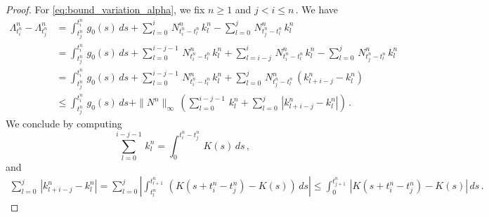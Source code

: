 \documentclass[10pt,a4paper]{amsart}
\begin{document}
\begin{proof}
    For \eqref{eq:bound_variation_alpha}, we fix $n \geq 1$ and $j < i \leq n\,$. We have 
    \begin{align*}
        \Lambda^n_{t^n_i} - \Lambda^n_{t^n_j} &= \int_{t^n_j}^{t^n_i}\,g_0(s)\,ds + \sum_{l = 0}^i\,N^n_{t^n_i - t^n_l}\,k^n_l - \sum_{l = 0}^j\,N^n_{t^n_j - t^n_l}\,k^n_l \\
        &= \int_{t^n_j}^{t^n_i}\,g_0(s)\,ds + \sum_{l = 0}^{i -j -1}\,N^n_{t^n_i - t^n_l}\,k^n_l + \sum_{l = i-j}^i\,N^n_{t^n_i - t^n_l}\,k^n_l - \sum_{l = 0}^j \,N^n_{t^n_j - t^n_l}\,k^n_l\\
        &= \int_{t^n_j}^{t^n_i}\,g_0(s)\,ds + \sum_{l = 0}^{i - j - 1}\,N^n_{t^n_i - t^n_l}\,k^n_l + \sum_{l = 0}^j\,N^n_{t^n_j - t^n_l}\,\left(k^n_{l + i -j} - k^n_l\right) \\
        &\leq \int_{t^n_j}^{t^n_i}\,g_0(s)\,ds + \|N^n\|_{\infty}\, \left(\sum_{l = 0}^{i-j-1}\,k^n_l + \sum_{l = 0}^j\,\left| k^n_{l + i - j} - k^n_l\right|\right)\,.
    \end{align*}
    We conclude by computing
    $$
    \sum_{l = 0}^{i - j-1}\,k^n_l = \int_0^{t^n_i - t^n_j}\,K(s)\,ds\,,
    $$
    and
    \begin{align*}
        \sum_{l = 0}^j\,\left| k^n_{l + i - j} - k^n_l\right| = \sum_{l = 0}^{j}\left|\int_{t^n_l}^{t^n_{l+1}}\,\left(K(s + t^n_i - t^n_j) - K(s) \right)\,ds \right|
        \leq \int_0^{t^n_{j+1}}\, \left|K(s + t^n_i - t^n_j) - K(s) \right|\,ds\,.
    \end{align*}
\end{proof}
\end{document}
